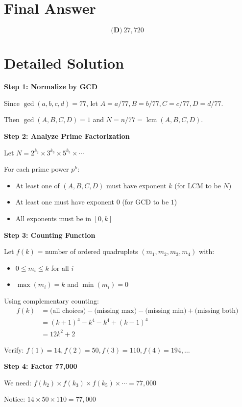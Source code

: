 \documentclass[11pt]{article}
\begin{document}
\section*{Final Answer}
\[\boxed{\textbf{(D)}\ 27,720}\]

\section*{Detailed Solution}
\textbf{Step 1: Normalize by GCD}

Since $\gcd(a,b,c,d) = 77$, let $A = a/77, B = b/77, C = c/77, D = d/77$.

Then $\gcd(A,B,C,D) = 1$ and $N = n/77 = \operatorname{lcm}(A,B,C,D)$.

\textbf{Step 2: Analyze Prime Factorization}

Let $N = 2^{k_2} \times 3^{k_3} \times 5^{k_5} \times \cdots$

For each prime power $p^k$:
\begin{itemize}
    \item At least one of $(A,B,C,D)$ must have exponent $k$ (for LCM to be $N$)
    \item At least one must have exponent $0$ (for GCD to be $1$)
    \item All exponents must be in $[0,k]$
\end{itemize}

\textbf{Step 3: Counting Function}

Let $f(k)$ = number of ordered quadruplets $(m_1,m_2,m_3,m_4)$ with:
\begin{itemize}
    \item $0 \le m_i \le k$ for all $i$
    \item $\max(m_i) = k$ and $\min(m_i) = 0$
\end{itemize}

Using complementary counting:
\begin{align*}
f(k) &= \text{(all choices)} - \text{(missing max)} - \text{(missing min)} + \text{(missing both)} \\
&= (k+1)^4 - k^4 - k^4 + (k-1)^4 \\
&= 12k^2 + 2
\end{align*}

Verify: $f(1) = 14, f(2) = 50, f(3) = 110, f(4) = 194, \ldots$

\textbf{Step 4: Factor 77,000}

We need: $f(k_2) \times f(k_3) \times f(k_5) \times \cdots = 77,000$

Notice: $14 \times 50 \times 110 = 77,000$
\end{document}

